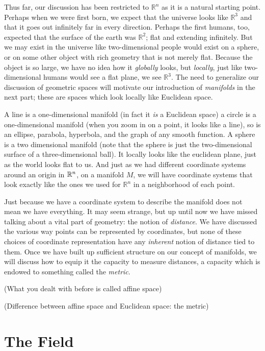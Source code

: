 	Thus far, our discussion has been restricted to $\mathbb{R}^n$ as it is a natural starting point.  Perhaps when we were first born, we expect that the universe looks like $\mathbb{R}^3$ and that it goes out infinitely far in every direction.  Perhaps the first humans, too, expected that the surface of the earth was $\mathbb R^2$; flat and extending infinitely.  But we may exist in the universe like two-dimensional people would exist on a sphere, or on some other object with rich geometry that is not merely flat. Because the object is so large, we have no idea how it \emph{globally} looks, but \emph{locally}, just like two-dimensional humans would see a flat plane, we see $\mathbb R^3$. The need to generalize our discussion of geometric spaces will motivate our introduction of \textit{manifolds} in the next part; these are spaces which look locally like Euclidean space.
	
	A line is a one-dimensional manifold (in fact it \emph{is} a Euclidean space) a circle is a one-dimensional manifold (when you zoom in on a point, it looks like a line), so is an ellipse, parabola, hyperbola, and the graph of any smooth function. A sphere is a two dimensional manifold (note that the sphere is just the two-dimensional surface of a three-dimensional ball). It locally looks like the euclidean plane, just as the world looks flat to us.   And just as we had different coordinate systems around an origin in $\mathbb{R}^n$, on a manifold $M$, we will  have coordinate systems that look exactly like the ones we used for $\mathbb{R}^n$ in a neighborhood of each point. 
	
	Just because we have a coordinate system to describe the manifold does not mean we have everything. It may seem strange, but up until now we have missed talking about a vital part of geometry: the notion of \emph{distance}. We have discussed the various way points can be represented by coordinates, but none of these choices of coordinate representation have any \emph{inherent} notion of distance tied to them.  Once we have built up sufficient structure on our concept of manifolds, we will discuss how to equip it the capacity to measure distances, a capacity which is endowed to something called the \textit{metric}. 
	
	(What you dealt with before is called affine space)
	
	(Difference between affine space and Euclidean space: the metric)
	
	
	
	\section{The Field} %
	\label{sec:the_field}
	
